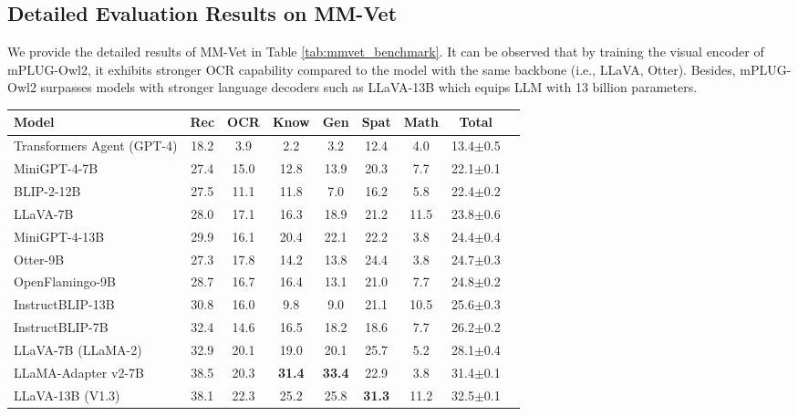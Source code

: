 \documentclass[10pt,twocolumn,letterpaper]{article}
\newlength\savewidth
\newcommand\shline{\noalign{\global\savewidth\arrayrulewidth\global\arrayrulewidth 1pt}\hline\noalign{\global\arrayrulewidth\savewidth}}
\newcommand{\modelname}{mPLUG-Owl2\xspace}
\begin{document}
\subsection{Detailed Evaluation Results on MM-Vet}
We provide the detailed results of MM-Vet in Table \ref{tab:mmvet_benchmark}. It can be observed that by training the visual encoder of \modelname, it exhibits stronger OCR capability compared to the model with the same backbone (i.e., LLaVA, Otter). Besides, \modelname surpasses models with stronger language decoders such as LLaVA-13B which equips LLM with 13 billion parameters.

\begin{table*}[t]
  \centering
    \begin{tabular}{lcccccccc}
    \shline
        Model & Rec & OCR & Know & Gen & Spat & Math & Total  \\ 
        \hline
        Transformers Agent (GPT-4) \cite{OpenAI2023gpt4} & 18.2 & 3.9 & 2.2 & 3.2 & 12.4 & 4.0 & 13.4$\pm$0.5 \\
        MiniGPT-4-7B \cite{Zhu2023MiniGPT4} & 27.4 & 15.0 & 12.8 & 13.9 & 20.3 & 7.7 & 22.1$\pm$0.1  \\ 
        BLIP-2-12B \cite{Li2023BLIP2} &  27.5 & 11.1 & 11.8 & 7.0 & 16.2 & 5.8 & 22.4$\pm$0.2 \\ 
        LLaVA-7B \cite{Liu2023Llava} & 28.0 & 17.1 & 16.3 & 18.9 & 21.2 &  11.5 & 23.8$\pm$0.6 \\ 
        MiniGPT-4-13B \cite{Zhu2023MiniGPT4} & 29.9 & 16.1 & 20.4 & 22.1 & 22.2 & 3.8 & 24.4$\pm$0.4 \\
        Otter-9B \cite{Li2023Otter} & 27.3 & 17.8 & 14.2 & 13.8 & 24.4 & 3.8 & 24.7$\pm$0.3 \\ 
        OpenFlamingo-9B \cite{awadalla2023openflamingo} & 28.7 & 16.7 & 16.4 & 13.1 & 21.0 & 7.7 & 24.8$\pm$0.2 \\
        InstructBLIP-13B \cite{Dai2023InstructBLIP} & 30.8 & 16.0 & 9.8 & 9.0 & 21.1 & 10.5 & 25.6$\pm$0.3 \\
        InstructBLIP-7B \cite{Dai2023InstructBLIP} & 32.4 & 14.6 & 16.5 & 18.2 & 18.6 & 7.7 & 26.2$\pm$0.2 \\
        LLaVA-7B (LLaMA-2) \cite{Liu2023Llava} & 32.9 & 20.1 & 19.0 & 20.1 & 25.7 & 5.2 & 28.1$\pm$0.4 \\
        LLaMA-Adapter v2-7B \cite{Gao2023LLaMAAdapterV2} &  38.5 & 20.3 &  \textbf{31.4} &  \textbf{33.4} & 22.9 & 3.8 & 31.4$\pm$0.1 \\
        LLaVA-13B (V1.3) \cite{Liu2023Llava} &  38.1 & 22.3 & 25.2 & 25.8 &  \textbf{31.3} & 11.2 &  32.5$\pm$0.1 \\

\end{tabular}
\end{table*}
\end{document}
